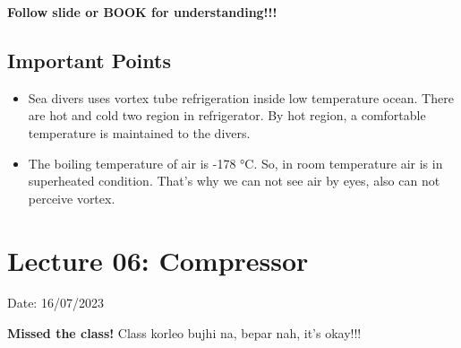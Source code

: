 \documentclass{article}
\begin{document}
\textbf{Follow slide or BOOK for understanding!!!} \\

\subsection*{Important Points}
\begin{itemize}
  \item Sea divers uses vortex tube refrigeration inside low temperature ocean. There are hot and cold two region in refrigerator. By hot region, a comfortable temperature is maintained to the divers. 
  \item The boiling temperature of air is -178 °C. So, in room temperature air is in superheated condition. That's why we can not see air by eyes, also can not perceive vortex. 
\end{itemize}

\section{Lecture 06: Compressor} 
\hfill Date: 16/07/2023 

\textbf{Missed the class!}
Class korleo bujhi na, bepar nah, it's okay!!!
\end{document}
